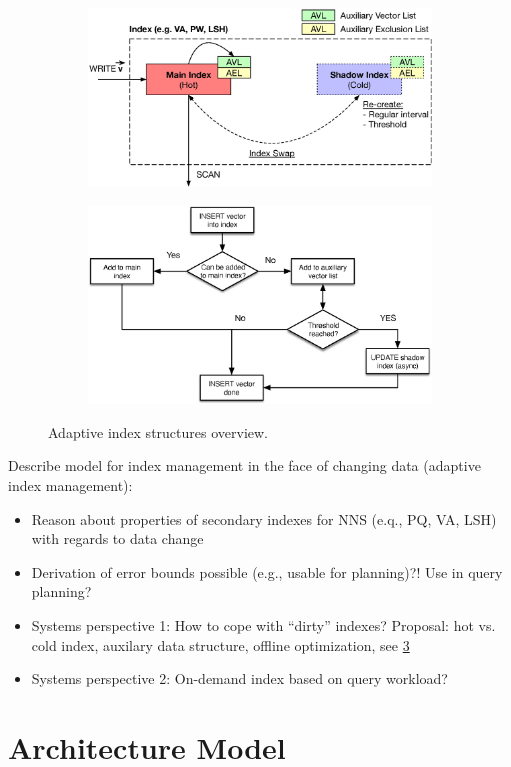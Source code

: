 \begin{figure}[h!]
    \centering
    \begin{subfigure}[b]{0.40\textwidth}
        \centering
        \includegraphics[width=\textwidth]{figures/adaptive_index.eps}
        \label{fig:adaptive_index:architecture}
    \end{subfigure}
    \hfill
    \begin{subfigure}[b]{0.40\textwidth}
        \centering
        \includegraphics[width=\textwidth]{figures/adaptive_index_flow.eps}
        \label{fig:adaptive_index:flow}
    \end{subfigure}
    \caption{Adaptive index structures overview.}
    \label{fig:adaptive_index}
\end{figure}

Describe model for index management in the face of changing data (adaptive index management):

\begin{itemize}
    \item Reason about properties of secondary indexes for NNS (e.q., PQ, VA, LSH) with regards to data change
    \item Derivation of error bounds possible (e.g., usable for planning)?! Use in query planning?
    \item Systems perspective 1: How to cope with ``dirty'' indexes? Proposal: hot vs. cold index, auxilary data structure, offline optimization, see \cref{fig:adaptive_index}
    \item Systems perspective 2: On-demand index based on query workload?
\end{itemize}

\section{Architecture Model}





